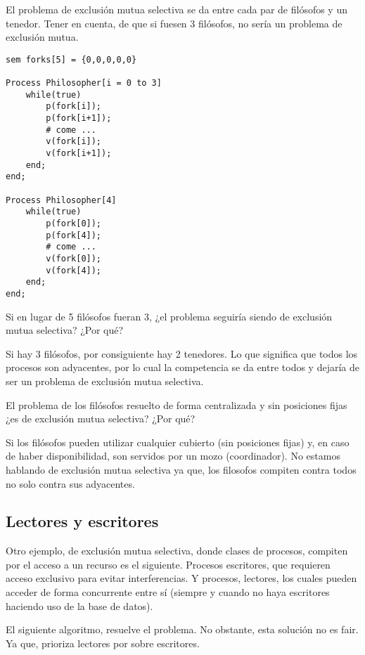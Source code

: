 \documentclass[a4paper, 10pt]{report}
\begin{document}
El problema de exclusión mutua selectiva se da entre cada par de filósofos y un tenedor. Tener en cuenta, de que si fuesen 3 filósofos, no sería un problema de exclusión mutua.


\begin{lstlisting}[multicols=2]
sem forks[5] = {0,0,0,0,0}

Process Philosopher[i = 0 to 3]
    while(true)
        p(fork[i]);
        p(fork[i+1]);
        # come ...
        v(fork[i]); 
        v(fork[i+1]);
    end;
end;

Process Philosopher[4]
    while(true)
        p(fork[0]);
        p(fork[4]);
        # come ...
        v(fork[0]); 
        v(fork[4]);
    end;
end;
\end{lstlisting}

\begin{basic_box}
     Si en lugar de 5 filósofos fueran 3, ¿el problema seguiría siendo de exclusión mutua selectiva? ¿Por qué?

    Si hay 3 filósofos, por consiguiente hay 2 tenedores. Lo que significa que todos los procesos son adyacentes, por lo cual la competencia se da entre todos y dejaría de ser un problema de exclusión mutua selectiva.
\end{basic_box}
\begin{basic_box}
     El problema de los filósofos resuelto de forma centralizada y sin posiciones fijas ¿es de exclusión mutua selectiva? ¿Por qué?

    Si los filósofos pueden utilizar cualquier cubierto (sin posiciones fijas) y, en caso de haber disponibilidad, son servidos por un mozo (coordinador). No estamos hablando de exclusión mutua selectiva ya que, los filosofos compiten contra todos no solo contra sus adyacentes.
\end{basic_box}

\subsection{Lectores y escritores}

Otro ejemplo, de exclusión mutua selectiva, donde clases de procesos, compiten por el acceso a un recurso es el siguiente. Procesos escritores, que requieren acceso exclusivo para evitar interferencias. Y procesos, lectores, los cuales pueden acceder de forma concurrente entre sí (siempre y cuando no haya escritores haciendo uso de la base de datos).

El siguiente algoritmo, resuelve el problema. No obstante, esta solución no es fair. Ya que, prioriza lectores por sobre escritores.
\end{document}
